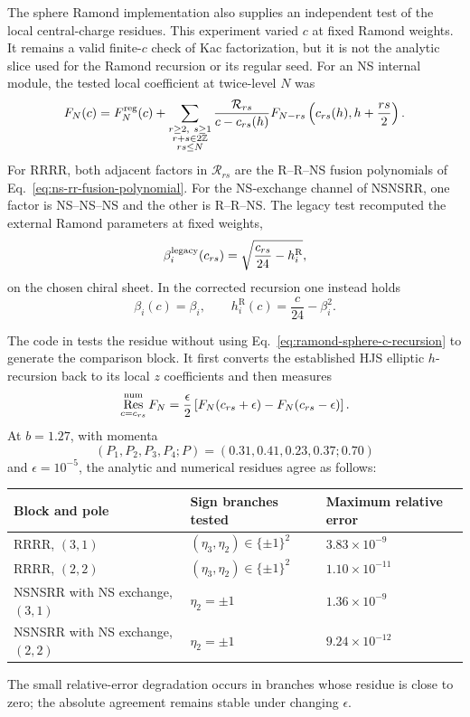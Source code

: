 \documentclass[11pt]{article}
\newcommand{\R}{\mathrm{R}}
\begin{document}
The sphere Ramond implementation also supplies an independent test of the
local central-charge residues.  This experiment varied \(c\) at fixed
Ramond weights.  It remains a valid finite-\(c\) check of Kac
factorization, but it is not the analytic slice used for the Ramond
recursion or its regular seed.  For an NS internal module, the tested local
coefficient at twice-level \(N\) was
\begin{equation}
 F_N(c)=F_N^{\rm reg}(c)
 +\sum_{\substack{r\geq2,\ s\geq1\\r+s\in2\mathbb Z\\rs\leq N}}
 \frac{\mathcal R_{rs}}{c-c_{rs}(h)}
 F_{N-rs}\left(c_{rs}(h),h+\frac{rs}{2}\right).
 \label{eq:ramond-sphere-c-recursion}
\end{equation}
For RRRR, both adjacent factors in $\mathcal R_{rs}$ are the
R--R--NS fusion polynomials of Eq.~\eqref{eq:ns-rr-fusion-polynomial}.
For the NS-exchange channel of NSNSRR, one factor is NS--NS--NS and the
other is R--R--NS.  The legacy test recomputed the external Ramond parameters
at fixed weights,
\begin{equation}
 \beta_i^{\rm legacy}(c_{rs})
 =\sqrt{\frac{c_{rs}}{24}-h_i^{\R}},
 \label{eq:fixed-h-external-beta}
\end{equation}
on the chosen chiral sheet.  In the corrected recursion one instead holds
\begin{equation}
 \beta_i(c)=\beta_i,
 \qquad
 h_i^{\R}(c)=\frac{c}{24}-\beta_i^2.
 \label{eq:fixed-beta-external-data}
\end{equation}

The code in  tests the residue
without using Eq.~\eqref{eq:ramond-sphere-c-recursion} to generate the
comparison block.  It first converts the established HJS elliptic
$h$-recursion back to its local $z$ coefficients and then measures
\begin{equation}
 \mathop{\rm Res}^{\rm num}_{c=c_{rs}}F_N
 =\frac{\epsilon}{2}
 \left[F_N(c_{rs}+\epsilon)-F_N(c_{rs}-\epsilon)\right].
 \label{eq:numerical-c-residue}
\end{equation}
At $b=1.27$, with momenta
\[
 (P_1,P_2,P_3,P_4;P)=(0.31,0.41,0.23,0.37;0.70)
\]
and $\epsilon=10^{-5}$, the analytic and numerical residues agree as
follows:
\begin{center}
\begin{tabular}{@{}lll@{}}
\toprule
Block and pole & Sign branches tested & Maximum relative error\\
\midrule
RRRR, $(3,1)$ & $(\eta_3,\eta_2)\in\{\pm1\}^2$
 & $3.83\times10^{-9}$\\
RRRR, $(2,2)$ & $(\eta_3,\eta_2)\in\{\pm1\}^2$
 & $1.10\times10^{-11}$\\
NSNSRR with NS exchange, $(3,1)$ & $\eta_2=\pm1$
 & $1.36\times10^{-9}$\\
NSNSRR with NS exchange, $(2,2)$ & $\eta_2=\pm1$
 & $9.24\times10^{-12}$\\
\bottomrule
\end{tabular}
\end{center}
The small relative-error degradation occurs in branches whose residue is
close to zero; the absolute agreement remains stable under changing
$\epsilon$.
\end{document}
